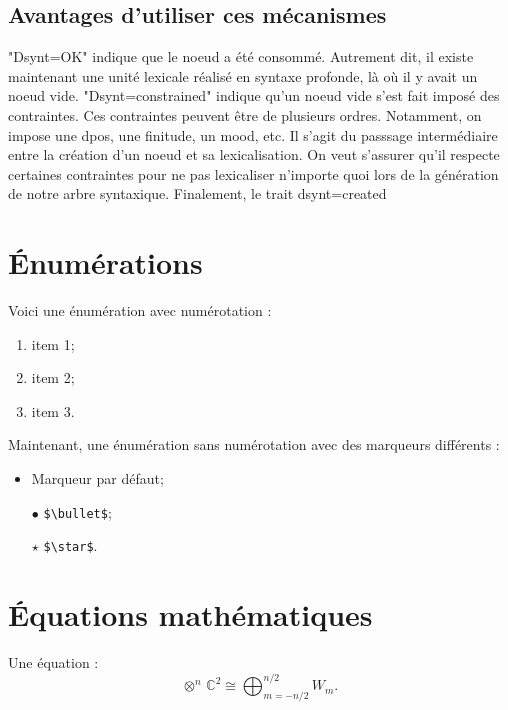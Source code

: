 \subsection{Avantages d'utiliser ces mécanismes}

"Dsynt=OK" indique que le noeud a été consommé. Autrement dit, il existe maintenant une unité lexicale réalisé en syntaxe profonde, là où il y avait un noeud vide.
"Dsynt=constrained" indique qu'un noeud vide s'est fait imposé des contraintes. Ces contraintes peuvent être de plusieurs ordres. Notamment, on impose une dpos, une finitude, un mood, etc. Il s'agit du passsage intermédiaire entre la création d'un noeud et sa lexicalisation. On veut s'assurer qu'il respecte certaines contraintes pour ne pas lexicaliser n'importe quoi lors de la génération de notre arbre syntaxique.
Finalement, le trait dsynt=created 

\section{Énumérations}

Voici une énumération avec numérotation :
\begin{enumerate}
	\item item 1;
	\item item 2;
	\item item 3.
\end{enumerate}
Maintenant, une énumération sans numérotation avec des marqueurs différents :
\begin{itemize}
	\item Marqueur par défaut;
	\item[$\bullet$] \verb|$\bullet$|;
	\item[$\star$] \verb|$\star$|.
\end{itemize}


\section{Équations mathématiques}

Une équation :
\begin{equation*}
	\otimes^n\,\mathbb{C}^2 \cong \bigoplus_{m=-n/2}^{n/2} W_m.
\end{equation*}


